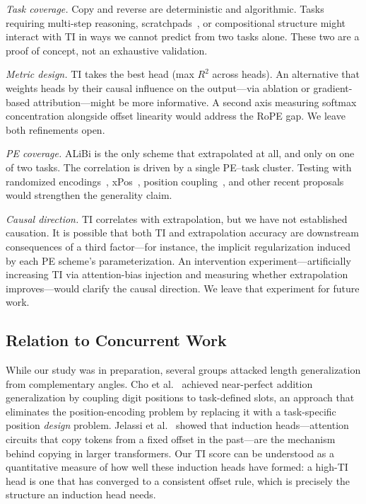 \documentclass[10pt,twocolumn]{article}
\begin{document}
\emph{Task coverage.}
Copy and reverse are deterministic and algorithmic.
Tasks requiring multi-step reasoning, scratchpads~\cite{zhou2024length}, or compositional structure might interact with TI in ways we cannot predict from two tasks alone.
These two are a proof of concept, not an exhaustive validation.

\emph{Metric design.}
TI takes the best head (max $R^2$ across heads).
An alternative that weights heads by their causal influence on the output---via ablation or gradient-based attribution---might be more informative.
A second axis measuring softmax concentration alongside offset linearity would address the RoPE gap.
We leave both refinements open.

\emph{PE coverage.}
ALiBi is the only scheme that extrapolated at all, and only on one of two tasks.
The correlation is driven by a single PE--task cluster.
Testing with randomized encodings~\cite{ruoss2023randomized}, xPos~\cite{sun2023length}, position coupling~\cite{cho2024position}, and other recent proposals would strengthen the generality claim.

\emph{Causal direction.}
TI correlates with extrapolation, but we have not established causation.
It is possible that both TI and extrapolation accuracy are downstream consequences of a third factor---for instance, the implicit regularization induced by each PE scheme's parameterization.
An intervention experiment---artificially increasing TI via attention-bias injection and measuring whether extrapolation improves---would clarify the causal direction.
We leave that experiment for future work.

\subsection{Relation to Concurrent Work}

While our study was in preparation, several groups attacked length generalization from complementary angles.
Cho et al.~\cite{cho2024position} achieved near-perfect addition generalization by coupling digit positions to task-defined slots, an approach that eliminates the position-encoding problem by replacing it with a task-specific position \emph{design} problem.
Jelassi et al.~\cite{jelassi2024repeat} showed that induction heads---attention circuits that copy tokens from a fixed offset in the past---are the mechanism behind copying in larger transformers.
Our TI score can be understood as a quantitative measure of how well these induction heads have formed: a high-TI head is one that has converged to a consistent offset rule, which is precisely the structure an induction head needs.
\end{document}
